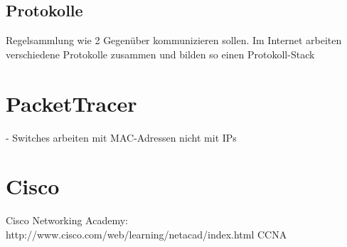 \documentclass[11pt,a4paper]{article}
\begin{document}
\subsection{Protokolle}
Regelsammlung wie 2 Gegenüber kommunizieren sollen. Im Internet arbeiten verschiedene Protokolle zusammen und bilden so einen Protokoll-Stack
\section{PacketTracer}
- Switches arbeiten mit MAC-Adressen nicht mit IPs
\section{Cisco}
Cisco Networking Academy: 
http://www.cisco.com/web/learning/netacad/index.html
CCNA
\end{document}
